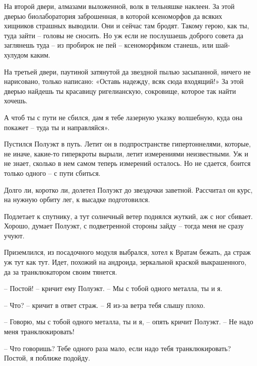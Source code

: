 \documentclass[ebook,oneside,final,openright]{memoir}
\begin{document}
\par
На второй двери, алмазами выложенной, волк в тельняшке наклеен. За этой дверью биолаборатория заброшенная, в которой ксеноморфов да всяких хищников страшных выводили. Они и сейчас там бродят. Такому герою, как ты, туда зайти – головы не сносить. Но уж если не послушаешь доброго совета да заглянешь туда – из пробирок не пей – ксеноморфиком станешь, или шай-хулудом каким.\par
\par
На третьей двери, паутиной затянутой да звездной пылью засыпанной, ничего не нарисовано, только написано: «Оставь надежду, всяк сюда входящий!» За этой дверью найдешь ты красавицу ригелианскую, сокровище, которое так найти хочешь.\par
\par
А чтоб ты с пути не сбился, дам я тебе лазерную указку волшебную, куда она покажет – туда ты и направляйся».\par
\par
Пустился Полуэкт в путь. Летит он в подпространстве гипертоннелями, которые, не иначе, какие-то гиперкроты вырыли, летит измерениями неизвестными. Уж и не знает, сколько в нем самом теперь измерений осталось. Но не сдается, боится только одного – с пути сбиться.\par
\par
Долго ли, коротко ли, долетел Полуэкт до звездочки заветной. Рассчитал он курс, на нужную орбиту лег, к высадке подготовился.\par
\par
Подлетает к спутнику, а тут солнечный ветер поднялся жуткий, аж с ног сбивает. Хорошо, думает Полуэкт, с подветренной стороны зайду – тогда меня не сразу учуют. \par
\par
 Приземлился, из посадочного модуля выбрался, хотел к Вратам бежать, да страж уж тут как тут. Идет, похожий на андроида, зеркальной краской выкрашенного, да за транклюкатором своим тянется. \par
 \par
– Постой! – кричит ему Полуэкт. – Мы с тобой одного металла, ты и я. \par
– Что? – кричит в ответ страж. – Я из-за ветра тебя слышу плохо. \par
– Говорю, мы с тобой одного металла, ты и я, – опять кричит Полуэкт. – Не надо меня транклюкировать!\par
– Что говоришь? Тебе одного раза мало, если надо тебя транклюкировать? Постой, я поближе подойду. \par
\end{document}
